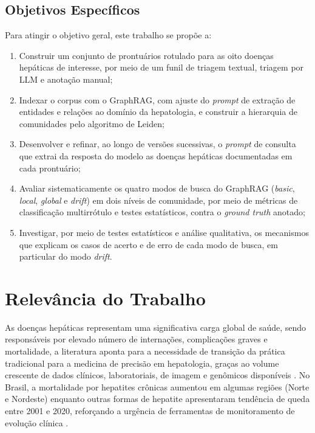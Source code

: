 \subsection{Objetivos Específicos}

Para atingir o objetivo geral, este trabalho se propõe a:

\begin{enumerate}
    \item Construir um conjunto de prontuários rotulado para as oito doenças hepáticas de interesse, por meio de um funil de triagem textual, triagem por LLM e anotação manual;

    \item Indexar o corpus com o GraphRAG, com ajuste do \textit{prompt} de extração de entidades e relações ao domínio da hepatologia, e construir a hierarquia de comunidades pelo algoritmo de Leiden;

    \item Desenvolver e refinar, ao longo de versões sucessivas, o \textit{prompt} de consulta que extrai da resposta do modelo as doenças hepáticas documentadas em cada prontuário;

    \item Avaliar sistematicamente os quatro modos de busca do GraphRAG (\textit{basic}, \textit{local}, \textit{global} e \textit{drift}) em dois níveis de comunidade, por meio de métricas de classificação multirrótulo e testes estatísticos, contra o \textit{ground truth} anotado;

    \item Investigar, por meio de testes estatísticos e análise qualitativa, os mecanismos que explicam os casos de acerto e de erro de cada modo de busca, em particular do modo \textit{drift}.

\end{enumerate}

\section{Relevância do Trabalho}\label{sec:relevancia}

As doenças hepáticas representam uma significativa carga global de saúde, sendo responsáveis por elevado número de internações, complicações graves e mortalidade, a literatura aponta para a necessidade de transição da prática tradicional para a medicina de precisão em hepatologia, graças ao volume crescente de dados clínicos, laboratoriais, de imagem e genômicos disponíveis \citep{SABRIE2023350}. No Brasil, a mortalidade por hepatites crônicas aumentou em algumas regiões (Norte e Nordeste) enquanto outras formas de hepatite apresentaram tendência de queda entre 2001 e 2020, reforçando a urgência de ferramentas de monitoramento de evolução clínica \citep{sousa2023}.

